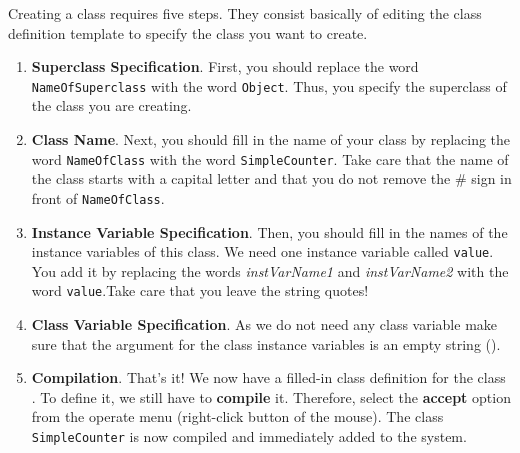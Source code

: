 

Creating a class requires five steps. They consist basically of
editing the class definition template to specify the class you
want to create. 

\begin{enumerate}
\item \textbf{Superclass Specification}. First, you should replace
the word \texttt{NameOfSuperclass} with the word \texttt{Object}. Thus, you specify the superclass of the class you are
creating.

\item \textbf{Class Name}. Next, you should fill in the name of
your class by replacing the word \texttt{NameOfClass} with the
word \texttt{SimpleCounter}. Take care that the name of the class
starts with a capital letter and that you do not remove the \#
sign in front of \texttt{NameOfClass}.

\item \textbf{Instance Variable Specification}. Then, you should
fill in the names of the instance variables of this class. We need
one instance variable called \texttt{value}. You add it by
replacing the words \textit{instVarName1} and
\textit{instVarName2} with the word \texttt{value}.Take
care that you leave the string quotes!

\item \textbf{Class Variable Specification}. As we do not need any class variable make sure that the argument  for the class instance variables is an empty string ().

\item \textbf{Compilation}. That's it! We now have a filled-in
class definition for the class . To define it, we still have to \textbf{compile} it. Therefore,
select the \textbf{accept} option from the operate menu
(right-click button of the mouse). The class
\texttt{SimpleCounter} is now compiled and immediately added to the system.
\end{enumerate}

